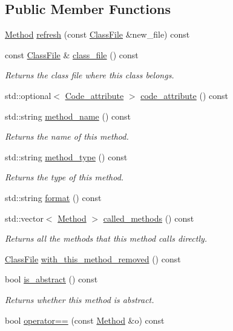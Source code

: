 \subsection*{Public Member Functions}
\begin{DoxyCompactItemize}
\item 
\hyperlink{classMethod}{Method} \hyperlink{classMethod_ac6a47d5797a62c5ffbb39df54ff7171d}{refresh} (const \hyperlink{classfile_8h_a00b46b60bc40e813e9fb1bb049174346}{Class\+File} \&new\+\_\+file) const
\item 
const \hyperlink{classfile_8h_a00b46b60bc40e813e9fb1bb049174346}{Class\+File} \& \hyperlink{classMethod_ac6eecb9ebb1eb23098c8556752353a81}{class\+\_\+file} () const
\begin{DoxyCompactList}\small\item\em Returns the class file where this class belongs. \end{DoxyCompactList}\item 
std\+::optional$<$ \hyperlink{structCode__attribute}{Code\+\_\+attribute} $>$ \hyperlink{classMethod_af92b40aa1a81df3a6827d688adc005bf}{code\+\_\+attribute} () const
\item 
std\+::string \hyperlink{classMethod_ab0855cbda89f070acc27ebff025ffd15}{method\+\_\+name} () const
\begin{DoxyCompactList}\small\item\em Returns the name of this method. \end{DoxyCompactList}\item 
std\+::string \hyperlink{classMethod_a86015f24da420dc7502bdac6138a4a47}{method\+\_\+type} () const
\begin{DoxyCompactList}\small\item\em Returns the type of this method. \end{DoxyCompactList}\item 
std\+::string \hyperlink{classMethod_a3f6d55a368a1e2727bea0799c3cdc0f6}{format} () const
\item 
std\+::vector$<$ \hyperlink{classMethod}{Method} $>$ \hyperlink{classMethod_a378e12e19cf0c8f21bfc13071382d15e}{called\+\_\+methods} () const
\begin{DoxyCompactList}\small\item\em Returns all the methods that {\itshape this} method calls directly. \end{DoxyCompactList}\item 
\hyperlink{classfile_8h_a00b46b60bc40e813e9fb1bb049174346}{Class\+File} \hyperlink{classMethod_a52e769352ce657232db3a1b936e930b1}{with\+\_\+this\+\_\+method\+\_\+removed} () const
\item 
bool \hyperlink{classMethod_a6dfb75c6faf8961c6e04a86eca6e97e8}{is\+\_\+abstract} () const
\begin{DoxyCompactList}\small\item\em Returns whether this method is abstract. \end{DoxyCompactList}\item 
bool \hyperlink{classMethod_afa02f09f3037782d08463433465181b6}{operator==} (const \hyperlink{classMethod}{Method} \&o) const
\end{DoxyCompactItemize}
